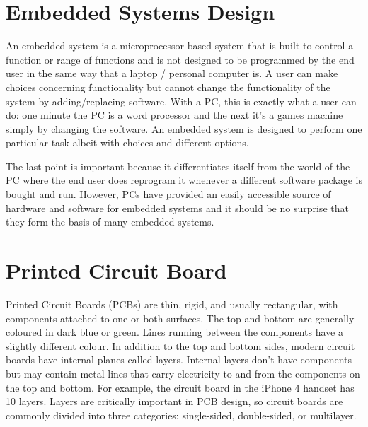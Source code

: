 \section{Embedded Systems Design} 


An embedded system is a microprocessor-based system
that is built to control a function or range of functions and is not designed to be
programmed by the end user in the same way that a laptop / personal computer is. A user can make choices
concerning functionality but cannot change the functionality of the system by
adding/replacing software. With a PC, this is exactly what a user can do: one minute
the PC is a word processor and the next it's a games machine simply by changing the
software. An embedded system is designed to perform one particular task albeit with
choices and different options.

The last point is important because it differentiates itself from the world of the PC
where the end user does reprogram it whenever a different software package is bought
and run. However, PCs have provided an easily accessible source of hardware and
software for embedded systems and it should be no surprise that they form the basis
of many embedded systems.

\section{Printed Circuit Board} 

Printed Circuit Boards (PCBs) are thin, rigid, and usually rectangular, with
components attached to one or both surfaces. The top and bottom are generally
coloured in dark blue or green. Lines running between the components have a slightly
different colour. In addition to the top and bottom sides, modern circuit boards have
internal planes called layers. Internal layers don’t have components but may contain
metal lines that carry electricity to and from the components on the top and bottom.
For example, the circuit board in the iPhone 4 handset has 10 layers. Layers are
critically important in PCB design, so circuit boards are commonly divided into three
categories: single-sided, double-sided, or multilayer. 

%
%
%
%
%
%


